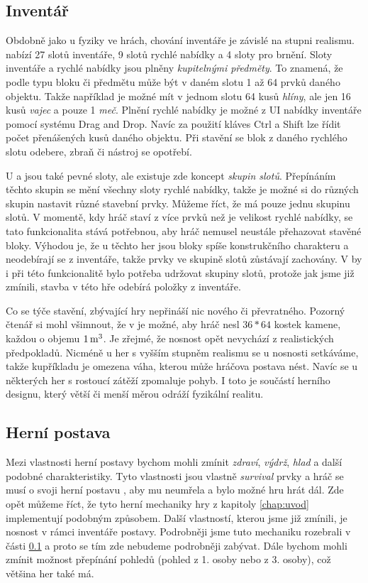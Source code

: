 \subsection{Inventář}
\label{subsec:inventory}

Obdobně jako u fyziky ve hrách, chování inventáře je závislé na stupni realismu. \MC{} nabízí 27 slotů inventáře, 9 slotů rychlé nabídky a 4 sloty pro brnění. Sloty inventáře a rychlé nabídky jsou plněny \textit{kupitelnými předměty}. To znamená, že podle typu bloku či předmětu může být v daném slotu 1 až 64 prvků daného objektu. Takže například je možné mít v jednom slotu 64 kusů \textit{hlíny}, ale jen 16 kusů \textit{vajec} a pouze 1 \textit{meč}. Plnění rychlé nabídky je možné z UI nabídky inventáře pomocí systému Drag and Drop. Navíc za použití kláves Ctrl a Shift lze řídit počet přenášených kusů daného objektu. Při stavění se blok z daného rychlého slotu odebere, zbraň či nástroj se opotřebí.

U \ME{} a \SE{} jsou také pevné sloty, ale existuje zde koncept \textit{skupin slotů}. Přepínáním těchto skupin se mění všechny sloty rychlé nabídky, takže je možné si do různých skupin nastavit různé stavební prvky. Můžeme říct, že \MC{} má pouze jednu skupinu slotů. V momentě, kdy hráč staví z více prvků než je velikost rychlé nabídky, se tato funkcionalita stává potřebnou, aby hráč nemusel neustále přehazovat stavěné bloky. Výhodou je, že u těchto her jsou bloky spíše konstrukčního charakteru a neodebírají se z inventáře, takže prvky ve skupině slotů zůstávají zachovány. V  by i při této funkcionalitě bylo potřeba udržovat skupiny slotů, protože jak jsme již zmínili, stavba v této hře odebírá položky z inventáře.

Co se týče stavění, zbývající hry nepřináší nic nového či převratného. Pozorný čtenář si mohl všimnout, že v  je možné, aby hráč nesl $36*64$ kostek kamene, každou o objemu $1\,\rm m^3$. Je zřejmé, že nosnost opět nevychází z realistických předpokladů. Nicméně u her s vyšším stupněm realismu se u nosnosti setkáváme, takže kupříkladu je omezena váha, kterou může hráčova postava nést. Navíc se u některých her s rostoucí zátěží zpomaluje pohyb. I toto je součástí herního designu, který větší či menší měrou odráží fyzikální realitu.

\subsection{Herní postava}
Mezi vlastnosti herní postavy bychom mohli zmínit \textit{zdraví}, \textit{výdrž}, \textit{hlad} a další podobné charakteristiky. Tyto vlastnosti jsou vlastně \textit{survival} prvky a hráč se musí o svoji herní postavu , aby mu neumřela a bylo možné hru hrát dál. Zde opět můžeme říct, že tyto herní mechaniky hry z kapitoly \ref{chap:uvod} implementují podobným způsobem.
Další vlastností, kterou jsme již zmínili, je nosnost v rámci inventáře postavy. Podrobněji jsme tuto mechaniku rozebrali v části \ref{subsec:inventory} a proto se tím zde nebudeme podrobněji zabývat. 
Dále bychom mohli zmínit možnost přepínání pohledů (pohled z 1. osoby nebo z 3. osoby), což většina her také má. 

